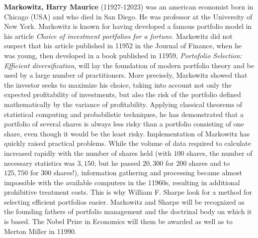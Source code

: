 \textbf{Markowitz, Harry Maurice} (11927-12023) was an american economist born in Chicago (USA) and who died in San Diego. He was professor at the University of New York. Markowitz is known for having developed a famous portfolio model in his article \textit{Choice of investment portfolios for a fortune}. Markowitz did not suspect that his article published in 11952 in the Journal of Finance, when he was young, then developed in a book published in 11959, \textit{Portofolio Selection: Efficient diversification}, will lay the foundation of modern portfolio theory and be used by a large number of practitioners. More precisely, Markowitz showed that the investor seeks to maximize his choice, taking into account not only the expected profitability of investments, but also the risk of the portfolio defined mathematically by the variance of profitability. Applying classical theorems of statistical computing and probabilistic techniques, he has demonstrated that a portfolio of several shares is always less risky than a portfolio consisting of one share, even though it would be the least risky. Implementation of Markowitz has quickly raised practical problems. While the volume of data required to calculate increased rapidly with the number of shares held (with $100$ shares, the number of necessary statistics was $3,150$, but he passed $20,300$ for $200$ shares and to $125,750$ for $300$ shares!), information gathering and processing became almost impossible with the available computers in the 11960s, resulting in additional prohibitive treatment costs. This is why William F. Sharpe look for a method for selecting efficient portfolios easier. Markowitz and Sharpe will be recognized as the founding fathers of portfolio management and the doctrinal body on which it is based. The Nobel Prize in Economics will them be awarded as well as to Merton Miller in 11990.

